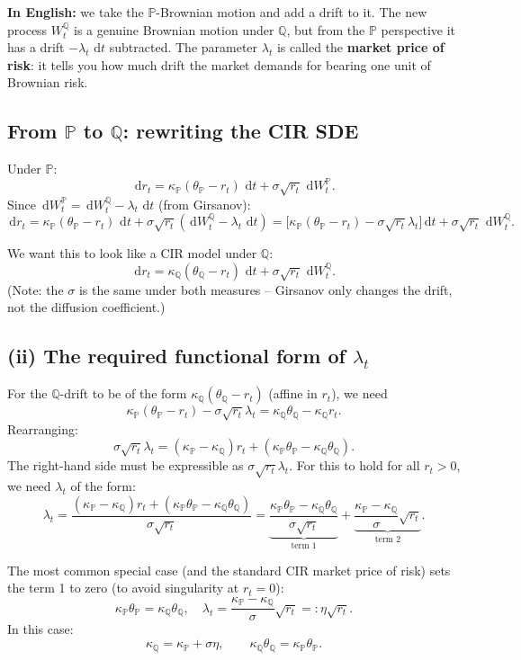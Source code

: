 \documentclass[11pt]{article}
\newcommand{\PP}{\mathbb{P}}
\newcommand{\QQ}{\mathbb{Q}}
\newcommand{\dd}{\,\mathrm{d}}
\begin{document}
\textbf{In English:} we take the $\PP$-Brownian motion and add a drift to
it.  The new process $W_t^\QQ$ is a genuine Brownian motion under $\QQ$,
but from the $\PP$ perspective it has a drift $-\lambda_t\,\dd t$ subtracted.
The parameter $\lambda_t$ is called the \textbf{market price of risk}: it
tells you how much drift the market demands for bearing one unit of
Brownian risk.

\subsection{From $\PP$ to $\QQ$: rewriting the CIR SDE}

Under $\PP$:
\[
\dd r_t = \kappa_\PP(\theta_\PP - r_t)\,\dd t + \sigma\sqrt{r_t}\,\dd W_t^\PP.
\]
Since $\dd W_t^\PP = \dd W_t^\QQ - \lambda_t\,\dd t$ (from Girsanov):
\[
\dd r_t
= \kappa_\PP(\theta_\PP - r_t)\,\dd t
+ \sigma\sqrt{r_t}(\dd W_t^\QQ - \lambda_t\,\dd t)
= \big[\kappa_\PP(\theta_\PP - r_t) - \sigma\sqrt{r_t}\lambda_t\big]\dd t
+ \sigma\sqrt{r_t}\,\dd W_t^\QQ.
\]

We want this to look like a CIR model under $\QQ$:
\[
\dd r_t = \kappa_\QQ(\theta_\QQ - r_t)\,\dd t + \sigma\sqrt{r_t}\,\dd W_t^\QQ.
\]
(Note: the $\sigma$ is the same under both measures -- Girsanov only changes
the drift, not the diffusion coefficient.)

\subsection{(ii) The required functional form of $\lambda_t$}

For the $\QQ$-drift to be of the form $\kappa_\QQ(\theta_\QQ - r_t)$ (affine in $r_t$), we need
\[
\kappa_\PP(\theta_\PP - r_t) - \sigma\sqrt{r_t}\lambda_t
= \kappa_\QQ\theta_\QQ - \kappa_\QQ r_t.
\]
Rearranging:
\[
\sigma\sqrt{r_t}\lambda_t
= (\kappa_\PP - \kappa_\QQ)r_t + (\kappa_\PP\theta_\PP - \kappa_\QQ\theta_\QQ).
\]
The right-hand side must be expressible as $\sigma\sqrt{r_t}\lambda_t$.
For this to hold for all $r_t > 0$, we need $\lambda_t$ of the form:
\[
\lambda_t = \frac{(\kappa_\PP-\kappa_\QQ)r_t + (\kappa_\PP\theta_\PP - \kappa_\QQ\theta_\QQ)}{\sigma\sqrt{r_t}}
= \underbrace{\frac{\kappa_\PP\theta_\PP - \kappa_\QQ\theta_\QQ}{\sigma\sqrt{r_t}}}_{\text{term 1}}
+ \underbrace{\frac{\kappa_\PP - \kappa_\QQ}{\sigma}\sqrt{r_t}}_{\text{term 2}}.
\]

The most common special case (and the standard CIR market price of risk)
sets the term 1 to zero (to avoid singularity at $r_t=0$):
\[
\kappa_\PP\theta_\PP = \kappa_\QQ\theta_\QQ,
\quad
\lambda_t = \frac{\kappa_\PP - \kappa_\QQ}{\sigma}\sqrt{r_t} =: \eta\sqrt{r_t}.
\]
In this case:
\[
\kappa_\QQ = \kappa_\PP + \sigma\eta,
\qquad
\kappa_\QQ\theta_\QQ = \kappa_\PP\theta_\PP.
\]
\end{document}
